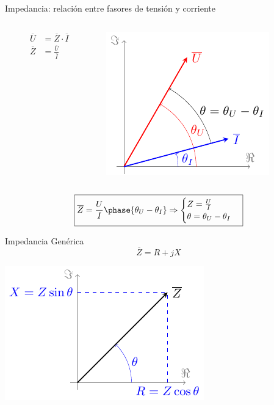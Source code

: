 \documentclass[aspectratio=169, usenames,svgnames,dvipsnames]{beamer}
\begin{document}
\begin{frame}[label={sec:org1609ae8}]{Impedancia: relación entre fasores de tensión y corriente}
\begin{columns}
\begin{column}{0.5\columnwidth}
\begin{align*}
  \overline{U} &= \overline{Z} \cdot \overline{I}\\                 
  \overline{Z} &= \frac{\overline{U}}{\overline{I}}
\end{align*}
\end{column}

\begin{column}{0.5\columnwidth}
\begin{center}
\includegraphics[height=0.5\textheight]{../figs/fasorTensionCorriente.pdf}
\end{center}
\end{column}
\end{columns}

\[
\boxed{\overline{Z} = \frac{U}{I}\phase{\theta_U - \theta_I} \Rightarrow 
    \begin{cases}
      Z = \frac{U}{I}\\
      \theta = \theta_U - \theta_I
    \end{cases}}
\]
\end{frame}



\begin{frame}[label={sec:org3abcbc7}]{Impedancia Genérica}
\[
\overline{Z} = R + j X
\]

\begin{center}
\includegraphics[height=0.75\textheight]{../figs/fasorImpedancia.pdf}
\end{center}
\end{frame}
\end{document}
